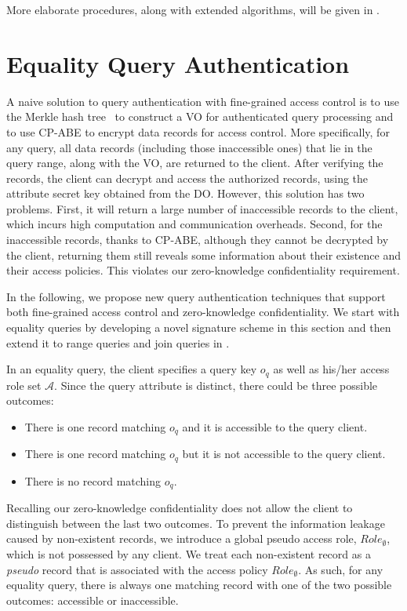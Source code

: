 More elaborate procedures, along with extended algorithms, will be given in .

\section{Equality Query Authentication}\label{sec:access-control:equality-query}

A naive solution to query authentication with fine-grained access control is to use the Merkle hash tree~\cite{10.1007/0-387-34805-0_21} to construct a VO for authenticated query processing and to use CP-ABE to encrypt data records for access control. More specifically, for any query, all data records (including those inaccessible ones) that lie in the query range, along with the VO, are returned to the client. After verifying the records, the client can decrypt and access the authorized records, using the attribute secret key obtained from the DO\@. However, this solution has two problems. First, it will return a large number of inaccessible records to the client, which incurs high computation and communication overheads. Second, for the inaccessible records, thanks to CP-ABE, although they cannot be decrypted by the client, returning them still reveals some information about their existence and their access policies. This violates our zero-knowledge confidentiality requirement.

In the following, we propose new query authentication techniques that support both fine-grained access control and zero-knowledge confidentiality. We start with equality queries by developing a novel signature scheme in this section and then extend it to range queries and join queries in .

In an equality query, the client specifies a query key $o_q$ as well as his/her access role set $\mathcal{A}$. Since the query attribute is distinct, there could be three possible outcomes:
\begin{itemize}
  \item There is one record matching $o_q$ and it is accessible to the query client.
  \item There is one record matching $o_q$ but it is not accessible to the query client.
  \item There is no record matching $o_q$.
\end{itemize}

Recalling our zero-knowledge confidentiality does not allow the client to distinguish between the last two outcomes. To prevent the information leakage caused by non-existent records, we introduce a global pseudo access role, ${Role}_{\emptyset}$, which is not possessed by any client. We treat each non-existent record as a \emph{pseudo} record that is associated with the access policy ${Role}_{\emptyset}$. As such, for any equality query, there is always one matching record with one of the two possible outcomes: accessible or inaccessible.


